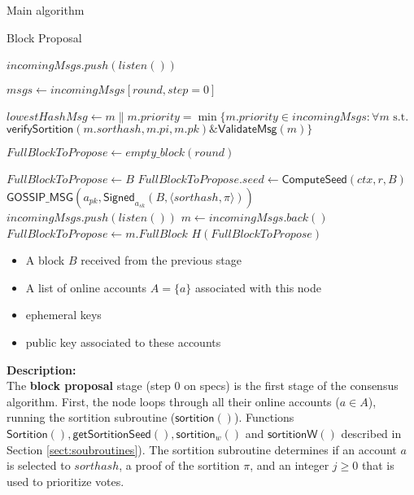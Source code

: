 \documentclass[10pt,a4paper]{article}
\begin{document}
\begin{section}{Main algorithm}
\begin{subsection}{Block Proposal}
\begin{algorithm}
\begin{algorithmic}[1]
            \State $incomingMsgs.push(listen())$
        \EndWhile\

        \State $msgs \gets incomingMsgs[round, step=0]$

        \State $lowestHashMsg \gets m \| m.priority = \min \{m.priority \in incomingMsgs : \forall m \text{ s.t. } $\newline
        ${}$ {\hskip 3cm}  $\mathsf{verifySortition}(m.sorthash, m.pi, m.pk) \& \mathsf{ValidateMsg}(m) \}$

        \State $FullBlockToPropose \gets empty\_block(round)$

            \State $FullBlockToPropose \gets B$
            \State $FullBlockToPropose.seed \gets \mathsf{ComputeSeed}(ctx, r, B)$
            \State $\mathsf{GOSSIP\_MSG}(a_{pk}, \mathsf{Signed}_{a_{sk}}(B, \langle sorthash, \pi \rangle))$
        \Else
        {
                \State $incomingMsgs.push(listen())$
                \State $m \gets incomingMsgs.back()$
                    \State $FullBlockToPropose \gets m.FullBlock$
                \EndIf
            \EndWhile
        }
        \EndIf
        \Return $H(FullBlockToPropose)$
    \EndFunction
    \end{algorithmic}
    \caption{\underline{Block proposal}}
\end{algorithm}

\newpage
{}
\begin{itemize}
    \item A block $B$ received from the previous stage
    \item A list of online accounts  $A=\{a\}$ associated with this node
    \item ephemeral keys
    \item public key associated to these accounts
  \end{itemize}
\noindent \textbf{Description:}\\
The {\bf block proposal} stage (step 0 on specs) is the first stage of the 
consensus algorithm. 
First, the node loops through all their online accounts ($a\in A$), 
running the sortition subroutine ($\mathsf{sortition}()$).
Functions  $\mathsf{Sortition}(), \mathsf{getSortitionSeed}(), \mathsf{sortition}_w()$ and
$\mathsf{sortitionW}()$ described in Section \ref{sect:soubroutines}). 
The sortition subroutine determines if an account $a$ is selected to 
${sorthash}$, a proof of the sortition $\pi$, and an integer $j\ge 0$
that is used to prioritize votes.


\end{subsection}
\end{section}
\end{document}
